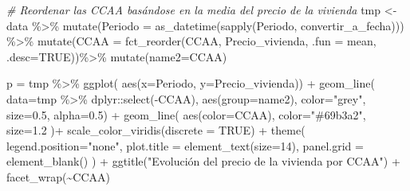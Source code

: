 \documentclass[
]{article}
\newenvironment{Shaded}{\begin{snugshade}}{\end{snugshade}}
\newcommand{\AttributeTok}[1]{\textcolor[rgb]{0.77,0.63,0.00}{#1}}
\newcommand{\CommentTok}[1]{\textcolor[rgb]{0.56,0.35,0.01}{\textit{#1}}}
\newcommand{\ConstantTok}[1]{\textcolor[rgb]{0.00,0.00,0.00}{#1}}
\newcommand{\DecValTok}[1]{\textcolor[rgb]{0.00,0.00,0.81}{#1}}
\newcommand{\FloatTok}[1]{\textcolor[rgb]{0.00,0.00,0.81}{#1}}
\newcommand{\FunctionTok}[1]{\textcolor[rgb]{0.00,0.00,0.00}{#1}}
\newcommand{\NormalTok}[1]{#1}
\newcommand{\OtherTok}[1]{\textcolor[rgb]{0.56,0.35,0.01}{#1}}
\newcommand{\SpecialCharTok}[1]{\textcolor[rgb]{0.00,0.00,0.00}{#1}}
\newcommand{\StringTok}[1]{\textcolor[rgb]{0.31,0.60,0.02}{#1}}
\begin{document}
\begin{Shaded}
\begin{Highlighting}[]
\CommentTok{\# Reordenar las CCAA basándose en la media del precio de la vivienda}
\NormalTok{tmp }\OtherTok{\textless{}{-}}\NormalTok{ data }\SpecialCharTok{\%\textgreater{}\%}
  \FunctionTok{mutate}\NormalTok{(}\AttributeTok{Periodo =} \FunctionTok{as\_datetime}\NormalTok{(}\FunctionTok{sapply}\NormalTok{(Periodo, convertir\_a\_fecha))) }\SpecialCharTok{\%\textgreater{}\%}
  \FunctionTok{mutate}\NormalTok{(}\AttributeTok{CCAA =} \FunctionTok{fct\_reorder}\NormalTok{(CCAA, Precio\_vivienda, }\AttributeTok{.fun =}\NormalTok{ mean, }\AttributeTok{.desc=}\ConstantTok{TRUE}\NormalTok{))}\SpecialCharTok{\%\textgreater{}\%}
    \FunctionTok{mutate}\NormalTok{(}\AttributeTok{name2=}\NormalTok{CCAA)}

\NormalTok{p }\OtherTok{=}\NormalTok{ tmp }\SpecialCharTok{\%\textgreater{}\%}
  \FunctionTok{ggplot}\NormalTok{( }\FunctionTok{aes}\NormalTok{(}\AttributeTok{x=}\NormalTok{Periodo, }\AttributeTok{y=}\NormalTok{Precio\_vivienda)) }\SpecialCharTok{+}
    \FunctionTok{geom\_line}\NormalTok{( }\AttributeTok{data=}\NormalTok{tmp }\SpecialCharTok{\%\textgreater{}\%}\NormalTok{ dplyr}\SpecialCharTok{::}\FunctionTok{select}\NormalTok{(}\SpecialCharTok{{-}}\NormalTok{CCAA), }\FunctionTok{aes}\NormalTok{(}\AttributeTok{group=}\NormalTok{name2), }\AttributeTok{color=}\StringTok{"grey"}\NormalTok{, }\AttributeTok{size=}\FloatTok{0.5}\NormalTok{, }\AttributeTok{alpha=}\FloatTok{0.5}\NormalTok{) }\SpecialCharTok{+}
    \FunctionTok{geom\_line}\NormalTok{( }\FunctionTok{aes}\NormalTok{(}\AttributeTok{color=}\NormalTok{CCAA), }\AttributeTok{color=}\StringTok{"\#69b3a2"}\NormalTok{, }\AttributeTok{size=}\FloatTok{1.2}\NormalTok{ )}\SpecialCharTok{+}
    \FunctionTok{scale\_color\_viridis}\NormalTok{(}\AttributeTok{discrete =} \ConstantTok{TRUE}\NormalTok{) }\SpecialCharTok{+}
    \FunctionTok{theme}\NormalTok{(}
      \AttributeTok{legend.position=}\StringTok{"none"}\NormalTok{,}
      \AttributeTok{plot.title =} \FunctionTok{element\_text}\NormalTok{(}\AttributeTok{size=}\DecValTok{14}\NormalTok{),}
      \AttributeTok{panel.grid =} \FunctionTok{element\_blank}\NormalTok{()}
\NormalTok{    ) }\SpecialCharTok{+}
    \FunctionTok{ggtitle}\NormalTok{(}\StringTok{"Evolución del precio de la vivienda por CCAA"}\NormalTok{) }\SpecialCharTok{+}
    \FunctionTok{facet\_wrap}\NormalTok{(}\SpecialCharTok{\textasciitilde{}}\NormalTok{CCAA)}
\end{Highlighting}
\end{Shaded}
\end{document}
